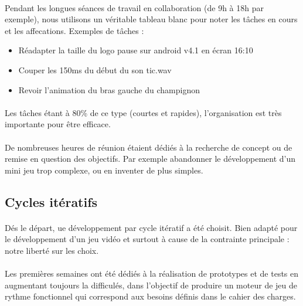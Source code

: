 \paragraph{}
Pendant les longues séances de travail en collaboration (de 9h à 18h par exemple), nous utilisons un véritable tableau blanc pour noter les tâches en cours et les affecations. Exemples de tâches :

\begin{itemize}
\item Réadapter la taille du logo pause sur android v4.1 en écran 16:10
\item Couper les 150ms du début du son tic.wav
\item Revoir l’animation du bras gauche du champignon
\end{itemize}

\paragraph{}
Les tâches étant à 80\% de ce type (courtes et rapides), l’organisation est très importante pour être efficace.

\paragraph{}
De nombreuses heures de réunion étaient dédiés à la recherche de concept ou de remise en question des objectifs. Par exemple abandonner le développement d’un mini jeu trop complexe, ou en inventer de plus simples.

\subsection{Cycles itératifs}

\paragraph{}
Dés le départ, ue développement par cycle itératif a été choisit. Bien adapté pour le développement d’un jeu vidéo et surtout à cause de la contrainte principale : notre liberté sur les choix.

\paragraph{}
Les premières semaines ont été dédiés à la réalisation de prototypes et de tests en augmentant toujours la difficulés, dans l’objectif de produire un moteur de jeu de rythme fonctionnel qui correspond aux besoins définis dans le cahier des charges.

